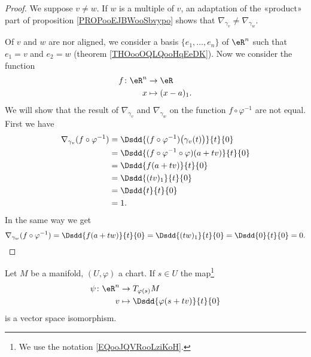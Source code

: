 \begin{proof}
	We suppose \( v\neq w\). If \( w\) is a multiple of \( v\), an adaptation of the «product» part of proposition \ref{PROPooEJBWooSbvypo} shows that \( \nabla_{\gamma_v}\neq \nabla_{\gamma_w}\).

	Of \( v\) and \( w\) are nor aligned, we consider a basis \( \{ e_1,\ldots, e_n \}\) of \( \eR^n\) such that \( e_1=v\) and \( e_2=w\) (theorem \ref{THOooOQLQooHqEeDK}). Now we consider the function
	\begin{equation}
		\begin{aligned}
			f\colon \eR^n & \to \eR          \\
			x             & \mapsto (x-a)_1.
		\end{aligned}
	\end{equation}
	We will show that the result of \( \nabla_{\gamma_v}\) and \( \nabla_{\gamma_w}\) on the function \( f\circ\varphi^{-1}\) are not equal. First we have
	\begin{subequations}
		\begin{align}
			\nabla_{\gamma_v}(f\circ\varphi^{-1}) & =\Dsdd{ (f\circ\varphi^{-1})\big( \gamma_v(t) \big) }{t}{0} \\
			                                      & =\Dsdd{ (f\circ\varphi^{-1}\circ\varphi)(a+tv) }{t}{0}      \\
			                                      & =\Dsdd{ f(a+tv) }{t}{0}                                     \\
			                                      & =\Dsdd{ (tv)_1 }{t}{0}                                      \\
			                                      & =\Dsdd{ t }{t}{0}                                           \\
			                                      & =1.
		\end{align}
	\end{subequations}
	In the same way we get
	\begin{equation}
		\nabla_{\gamma_w}(f\circ\varphi^{-1})=\Dsdd{ f(a+tw) }{t}{0}=\Dsdd{ (tw)_1 }{t}{0}=\Dsdd{ 0 }{t}{0}=0.
	\end{equation}
\end{proof}


\begin{proposition}     \label{PROPooMEPPooRonxuh}
	Let \( M\) be a manifold, \( (U, \varphi)\) a chart. If \( s\in U\) the map\footnote{We use the notation \eqref{EQooJQVRooLziKoH}.}
	\begin{equation}        \label{EQooJMTJooZNzREy}
		\begin{aligned}
			\psi\colon \eR^n & \to T_{\varphi(s)}M                  \\
			v                & \mapsto \Dsdd{ \varphi(s+tv) }{t}{0}
		\end{aligned}
	\end{equation}
	is a vector space isomorphism.
\end{proposition}

